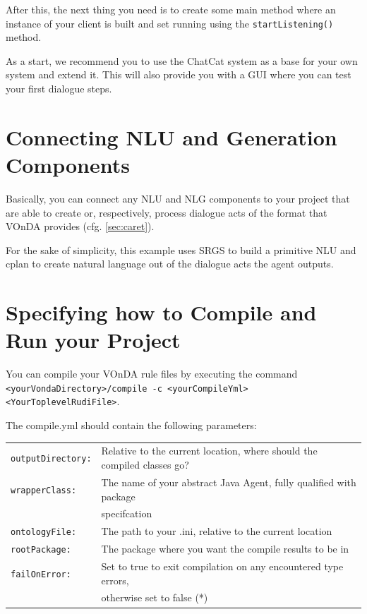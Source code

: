 \documentclass[a4paper]{report}
\newcommand{\vonda}{VOnDA\xspace}
\begin{document}
After this, the next thing you need is to create some main method where an instance of your client is built and set running using the \texttt{startListening()} method.

As a start, we recommend you to use the ChatCat system as a base for your own system and extend it. This will also provide you with a GUI where you can test your first dialogue steps.

\section{Connecting NLU and Generation Components}

Basically, you can connect any NLU and NLG components to your project that are able to create or, respectively, process dialogue acts of the format that \vonda provides (cfg. \ref{sec:caret}).

For the sake of simplicity, this example uses SRGS to build a primitive NLU and cplan to create natural language out of the dialogue acts the agent outputs.

\section{Specifying how to Compile and Run your Project}

You can compile your \vonda rule files by executing the command\\ \verb|<yourVondaDirectory>/compile -c <yourCompileYml> <YourToplevelRudiFile>|.

The compile.yml should contain the following parameters:\\

\begin{tabular}{ll}
	\verb|outputDirectory:| & Relative to the current location, where should the compiled classes go?\\
	\verb|wrapperClass:| & The name of your abstract Java Agent, fully qualified with package \\&specifcation\\
	\verb|ontologyFile:| &The path to your .ini, relative to the current location\\
	\verb|rootPackage:| &The package where you want the compile results to be in\\
	\verb|failOnError:| &Set to true to exit compilation on any encountered type errors,\\& otherwise set to false (*)\\
\end{tabular}\newline
\end{document}
